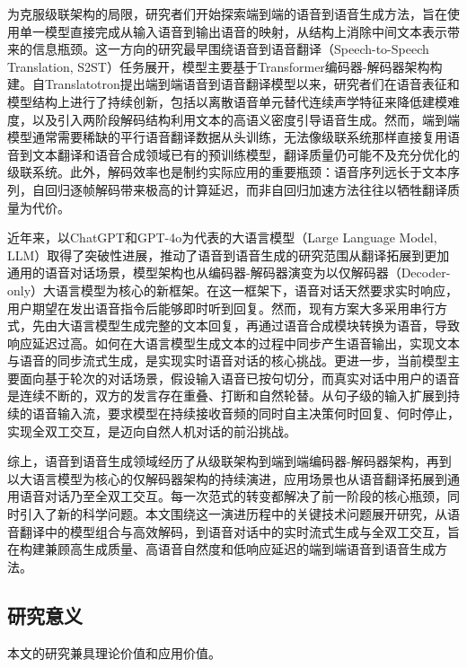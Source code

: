 为克服级联架构的局限，研究者们开始探索端到端的语音到语音生成方法，旨在使用单一模型直接完成从输入语音到输出语音的映射，从结构上消除中间文本表示带来的信息瓶颈。这一方向的研究最早围绕语音到语音翻译（Speech-to-Speech Translation, S2ST）任务展开，模型主要基于Transformer\citep{transformer}编码器-解码器架构构建。自Translatotron\citep{translatotron}提出端到端语音到语音翻译模型以来，研究者们在语音表征和模型结构上进行了持续创新，包括以离散语音单元\citep{s2ut}替代连续声学特征来降低建模难度，以及引入两阶段解码结构\citep{translatotron2,inaguma-etal-2023-unity}利用文本的高语义密度引导语音生成。然而，端到端模型通常需要稀缺的平行语音翻译数据从头训练，无法像级联系统那样直接复用语音到文本翻译和语音合成领域已有的预训练模型，翻译质量仍可能不及充分优化的级联系统。此外，解码效率也是制约实际应用的重要瓶颈：语音序列远长于文本序列，自回归逐帧解码带来极高的计算延迟，而非自回归加速方法往往以牺牲翻译质量为代价。

近年来，以ChatGPT\citep{chatgpt}和GPT-4o\citep{gpt4o}为代表的大语言模型（Large Language Model, LLM）取得了突破性进展，推动了语音到语音生成的研究范围从翻译拓展到更加通用的语音对话场景，模型架构也从编码器-解码器演变为以仅解码器（Decoder-only）大语言模型为核心的新框架。在这一框架下，语音对话天然要求实时响应，用户期望在发出语音指令后能够即时听到回复。然而，现有方案大多采用串行方式，先由大语言模型生成完整的文本回复，再通过语音合成模块转换为语音，导致响应延迟过高。如何在大语言模型生成文本的过程中同步产生语音输出，实现文本与语音的同步流式生成，是实现实时语音对话的核心挑战。更进一步，当前模型主要面向基于轮次的对话场景，假设输入语音已按句切分，而真实对话中用户的语音是连续不断的，双方的发言存在重叠、打断和自然轮替。从句子级的输入扩展到持续的语音输入流，要求模型在持续接收音频的同时自主决策何时回复、何时停止，实现全双工交互，是迈向自然人机对话的前沿挑战。

综上，语音到语音生成领域经历了从级联架构到端到端编码器-解码器架构，再到以大语言模型为核心的仅解码器架构的持续演进，应用场景也从语音翻译拓展到通用语音对话乃至全双工交互。每一次范式的转变都解决了前一阶段的核心瓶颈，同时引入了新的科学问题。本文围绕这一演进历程中的关键技术问题展开研究，从语音翻译中的模型组合与高效解码，到语音对话中的实时流式生成与全双工交互，旨在构建兼顾高生成质量、高语音自然度和低响应延迟的端到端语音到语音生成方法。

\subsection{研究意义}

本文的研究兼具理论价值和应用价值。

